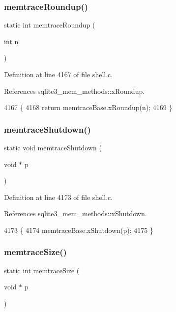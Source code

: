 \subsubsection{memtrace\+Roundup()}
{\footnotesize\ttfamily static int memtrace\+Roundup (\begin{DoxyParamCaption}\item[{int}]{n }\end{DoxyParamCaption})\hspace{0.3cm}{\ttfamily [static]}}



Definition at line 4167 of file shell.\+c.



References sqlite3\+\_\+mem\+\_\+methods\+::x\+Roundup.


\begin{DoxyCode}
4167                                  \{
4168   \textcolor{keywordflow}{return} memtraceBase.xRoundup(n);
4169 \}
\end{DoxyCode}
\mbox{\label{shell_8c_af2db2290b1a7a3632942e50b3f4cb7b9}} 
\subsubsection{memtrace\+Shutdown()}
{\footnotesize\ttfamily static void memtrace\+Shutdown (\begin{DoxyParamCaption}\item[{void $\ast$}]{p }\end{DoxyParamCaption})\hspace{0.3cm}{\ttfamily [static]}}



Definition at line 4173 of file shell.\+c.



References sqlite3\+\_\+mem\+\_\+methods\+::x\+Shutdown.


\begin{DoxyCode}
4173                                      \{
4174   memtraceBase.xShutdown(p);
4175 \}
\end{DoxyCode}
\mbox{\label{shell_8c_abe2741d2490f6ffc6cfa349778eaa470}} 
\subsubsection{memtrace\+Size()}
{\footnotesize\ttfamily static int memtrace\+Size (\begin{DoxyParamCaption}\item[{void $\ast$}]{p }\end{DoxyParamCaption})\hspace{0.3cm}{\ttfamily [static]}}



